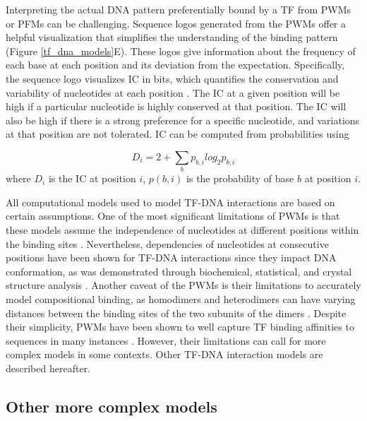     Interpreting the actual DNA pattern preferentially bound by a TF from PWMs or PFMs can be challenging. Sequence logos generated from the PWMs offer a helpful visualization that simplifies the understanding of the binding pattern \cite{schneider1990sequence} ({Figure \ref{tf_dna_models}}E). These logos give information about the frequency of each base at each position and its deviation from the expectation. Specifically, the sequence logo visualizes \ac{IC} in bits, which quantifies the conservation and variability of nucleotides at each position \cite{schneider1990sequence,wasserman2004applied}. The IC at a given position will be high if a particular nucleotide is highly conserved at that position. The IC will also be high if there is a strong preference for a specific nucleotide, and variations at that position are not tolerated. IC can be computed from probabilities using

    \begin{equation}
      D_{i}=2+\sum\limits_{b}p_{b,i}log_{2}p_{b,i}
      \label{ic}
    \end{equation}
    where $ D_{i} $ is the IC at position $ i $, $ p(b,i) $ is the probability of base $ b $ at position $ i $.

    All computational models used to model TF-DNA interactions are based on certain assumptions. One of the most significant limitations of PWMs is that these models assume the independence of nucleotides at different positions within the binding sites \cite{wasserman2004applied,mathelier2013next,weirauch2013evaluation}. Nevertheless, dependencies of nucleotides at consecutive positions have been shown for TF-DNA interactions since they impact DNA conformation, as was demonstrated through biochemical, statistical, and crystal structure analysis \cite{mathelier2013next}. Another caveat of the PWMs is their limitations to accurately model compositional binding, as homodimers and heterodimers can have varying distances between the binding sites of the two subunits of the dimers \cite{wasserman2004applied,mathelier2013next}. Despite their simplicity, PWMs have been shown to well capture TF binding affinities to sequences in many instances \cite{zhao2011quantitative,stormo2010determining}. However, their limitations can call for more complex models in some contexts. Other TF-DNA interaction models are described hereafter.

    \subsection{Other more complex models}


